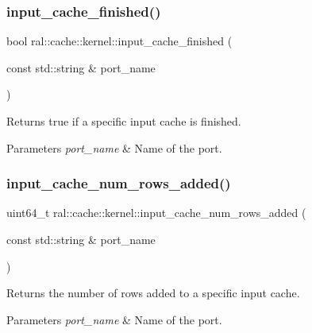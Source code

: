\subsubsection{\texorpdfstring{input\+\_\+cache\+\_\+finished()}{input\_cache\_finished()}}
{\footnotesize\ttfamily bool ral\+::cache\+::kernel\+::input\+\_\+cache\+\_\+finished (\begin{DoxyParamCaption}\item[{const std\+::string \&}]{port\+\_\+name }\end{DoxyParamCaption})\hspace{0.3cm}{\ttfamily [inline]}}



Returns true if a specific input cache is finished. 


\begin{DoxyParams}{Parameters}
{\em port\+\_\+name} & Name of the port. \\
\hline
\end{DoxyParams}
\mbox{\label{classral_1_1cache_1_1kernel_a25cd1d59552733027ba6396cd9e41004}} 
\subsubsection{\texorpdfstring{input\+\_\+cache\+\_\+num\+\_\+rows\+\_\+added()}{input\_cache\_num\_rows\_added()}}
{\footnotesize\ttfamily uint64\+\_\+t ral\+::cache\+::kernel\+::input\+\_\+cache\+\_\+num\+\_\+rows\+\_\+added (\begin{DoxyParamCaption}\item[{const std\+::string \&}]{port\+\_\+name }\end{DoxyParamCaption})\hspace{0.3cm}{\ttfamily [inline]}}



Returns the number of rows added to a specific input cache. 


\begin{DoxyParams}{Parameters}
{\em port\+\_\+name} & Name of the port. \\
\hline
\end{DoxyParams}
\mbox{\label{classral_1_1cache_1_1kernel_a94c3bd66b93a0e67165d0a54741c19dc}} 

